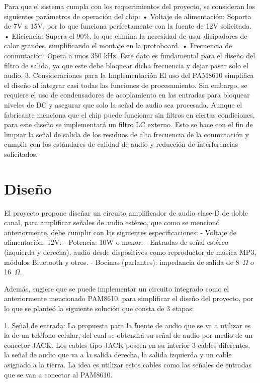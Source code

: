 \documentclass[journal, onecolumn]{IEEEtran}
\begin{document}
Para que el sistema cumpla con los requerimientos del proyecto, se consideran
los siguientes parámetros de operación del chip:
• Voltaje de alimentación: Soporta de 7V a 15V, por lo que funciona perfectamente
con la fuente de 12V solicitada.
• Eficiencia: Supera el 90\%, lo que elimina la necesidad de usar disipadores de
calor grandes, simplificando el montaje en la protoboard.
• Frecuencia de conmutación: Opera a unos 350 kHz. Este dato es fundamental
para el diseño del filtro de salida, ya que este debe bloquear dicha frecuencia y
dejar pasar solo el audio.
3. Consideraciones para la Implementación
El uso del PAM8610 simplifica el diseño al integrar casi todas las funciones de
procesamiento. Sin embargo, se requiere el uso de condensadores de acoplamiento en
las entradas para bloquear niveles de DC y asegurar que solo la señal de audio sea
procesada.
Aunque el fabricante menciona que el chip puede funcionar sin filtros en ciertas
condiciones, para este diseño se implementará un filtro LC externo. Esto se hace con el
fin de limpiar la señal de salida de los residuos de alta frecuencia de la conmutación y
cumplir con los estándares de calidad de audio y reducción de interferencias solicitados.

\section{Diseño}
El proyecto propone diseñar un circuito amplificador de audio clase-D de doble
canal, para amplificar señales de audio estéreo, que como se mencionó anteriormente,
debe cumplir con las siguientes especificaciones:
- Voltaje de alimentación: 12V.
- Potencia: 10W o menor.
- Entradas de señal estéreo (izquierda y derecha), audio desde dispositivos como
reproductor de música MP3, módulos Bluetooth y otros.
- Bocinas (parlantes): impedancia de salida de 8~$\Omega$ o 16~$\Omega$.

Además, sugiere que se puede implementar un circuito integrado como el
anteriormente mencionado PAM8610, para simplificar el diseño del proyecto, por lo que
se planteó la siguiente solución que consta de 3 etapas:

1. Señal de entrada: La propuesta para la fuente de audio que se va a utilizar es la de
un teléfono celular, del cual se obtendrá su señal de audio por medio de un
conector JACK. Los cables tipo JACK poseen en su interior 3 cables diferentes, la
señal de audio que va a la salida derecha, la salida izquierda y un cable asignado
a la tierra. La idea es utilizar estos cables como las señales de entradas que se
van a conectar al PAM8610.
\end{document}
